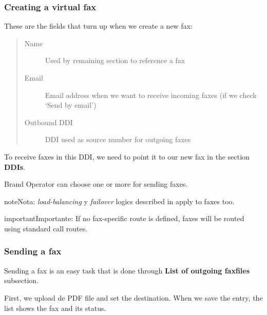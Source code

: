 \documentclass[letterpaper,10pt,spanish]{sphinxmanual}
\begin{document}
\subsubsection{Creating a virtual fax}
\label{administration_portal/client/vpbx/faxes:creating-a-virtual-fax}
These are the fields that turn up when we create a new fax:
\begin{quote}
\begin{description}
\item[{Name}] \leavevmode
Used by remaining section to reference a fax

\item[{Email}] \leavevmode
Email address when we want to receive incoming faxes (if we check `Send
by email')

\item[{Outbound DDI}] \leavevmode
DDI used as source number for outgoing faxes

\end{description}
\end{quote}

To receive faxes in this DDI, we need to point it to our new fax in the section
\textbf{DDIs}.

Brand Operator can choose one or more {\hyperref[administration_portal/brand/routing/outgoing_routings:outgoing\string-routings]{}} for sending faxes.

\begin{notice}{note}{Nota:}
\emph{load-balancing} y \emph{failover} logics described in {\hyperref[administration_portal/brand/routing/outgoing_routings:outgoing\string-routings]{}}
apply to faxes too.
\end{notice}

\begin{notice}{important}{Importante:}
If no fax-specific route is defined, faxes will be routed using
standard call routes.
\end{notice}


\subsubsection{Sending a fax}
\label{administration_portal/client/vpbx/faxes:sending-a-fax}
Sending a fax is an easy task that is done through \textbf{List of outgoing faxfiles} subsection.

First, we upload de PDF file and set the destination. When we save the entry, the list shows the fax and its status.
\end{document}
